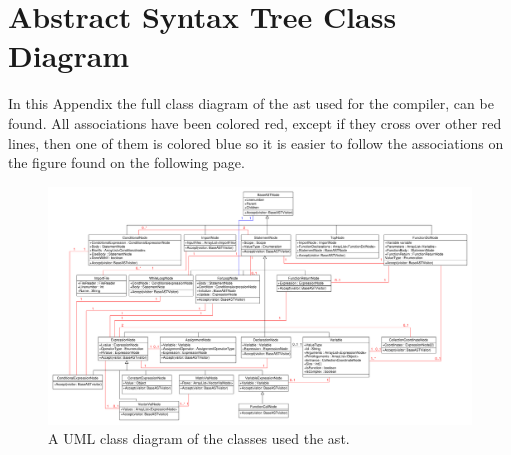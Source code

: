 \chapter{Abstract Syntax Tree Class Diagram}\label{ASTNodes}
In this Appendix the full class diagram of the \acrshort{ast} used for the compiler, can be found.
All associations have been colored red, except if they cross over other red lines, then one of them is colored blue so it is easier to follow the associations on the figure found on the following page.
\begin{figure}   
\vspace{-10pt}
\centering
 \includegraphics[scale=0.42]{figures/ClassDiagrams/ASTClassDiagram.pdf} %
\caption{A UML class diagram of the classes used the \acrshort{ast}.}\label{image:ASTNodes}
\vspace{-10pt}
\end{figure}